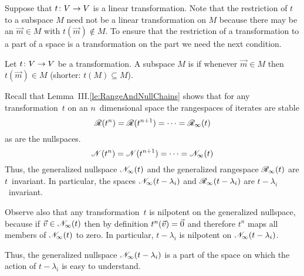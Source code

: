 Suppose that \( \mbox{$t\colon V\to V$} \) is a linear transformation.
Note that the restriction %
of \( t \) to a subspace \( M \) need not be a linear transformation on \( M \)
because there may be an \( \vec{m}\in M \)
with \( t(\vec{m})\not\in M \).
To ensure that the restriction of a transformation 
to a part of a space is a transformation on the part we need the next 
condition. 

\begin{definition} \label{def:invariant}
Let \( \mbox{$t\colon V\to V$} \) be a transformation.
A subspace \( M \) is %
if whenever \( \vec{m}\in M \) then \( t(\vec{m})\in M \)
(shorter: \( t(M)\subseteq M \)).
\end{definition}
 
Recall that Lemma~III.\ref{le:RangeAndNullChains} shows that for any
transformation~$t$ on an $n$~dimensional space
the rangespaces of iterates are stable 
\begin{equation*}
  \mathscr{R}(t^n)=\mathscr{R}(t^{n+1})=\cdots=\mathscr{R}_\infty(t)
\end{equation*} 
as are the nullspaces. 
\begin{equation*}
  \mathscr{N}(t^n)=\mathscr{N}(t^{n+1})=\cdots=\mathscr{N}_\infty(t)
\end{equation*} 
Thus,
the generalized nullspace $\mathscr{N}_\infty(t)$ and the generalized rangespace
$\mathscr{R}_\infty(t)$ are $t$~invariant.
In particular, 
the spaces $\mathscr{N}_\infty(t-\lambda_i)$ and $\mathscr{R}_\infty(t-\lambda_i)$
are $t-\lambda_i$~invariant.

Observe also that any transformation~$t$ is nilpotent on the 
generalized nullspace, because if $\vec{v}\in\mathscr{N}_\infty(t)$ then 
by definition $t^n(\vec{v})=\vec{0}$ and therefore $t^n$ maps all members
of $\mathscr{N}_\infty(t)$ to zero. 
In particular, $t-\lambda_i$ is nilpotent on 
$\mathscr{N}_\infty(t-\lambda_i)$.

Thus, the generalized nullspace $\mathscr{N}_\infty(t-\lambda_i)$ is a part of
the space on which the action of $t-\lambda_i$ is easy to understand.

